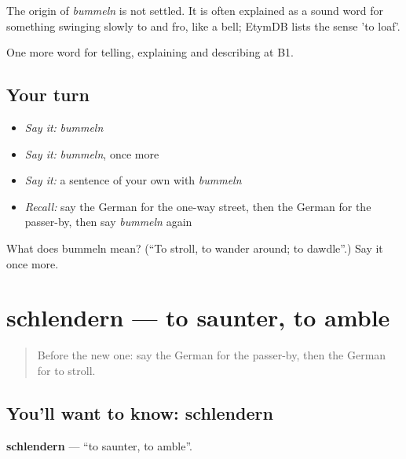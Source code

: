 \begin{cousinweb}
The origin of \emph{bummeln} is not settled. It is often explained as a sound word for something swinging slowly to and fro, like a bell; EtymDB lists the sense 'to loaf'.
\end{cousinweb}

\begin{grammarlens}[title={What you've built}]
One more word for telling, explaining and describing at B1.
\end{grammarlens}

\subsection*{Your turn}
\begin{itemize}
\raggedright
  \item \emph{Say it:} \emph{bummeln}
  \item \emph{Say it:} \emph{bummeln}, once more
  \item \emph{Say it:} a sentence of your own with \emph{bummeln}
  \item \emph{Recall:} say the German for the one-way street, then the German for the passer-by, then say \emph{bummeln} again
\end{itemize}

\begin{tcolorbox}[breakable,colback=teal!4,colframe=teal!35!black,title={Before you move on}]
What does bummeln mean? (\textquotedblleft{}To stroll, to wander around; to dawdle\textquotedblright{}.) Say it once more.
\end{tcolorbox}
\section[schlendern]{schlendern — to saunter, to amble}

\label{lesson:GE-C437-schlendern}



\begin{quote}
Before the new one: say the German for the passer-by, then the German for to stroll.
\end{quote}

\subsection*{You'll want to know: schlendern}
\textbf{schlendern} — \textquotedblleft{}to saunter, to amble\textquotedblright{}.

